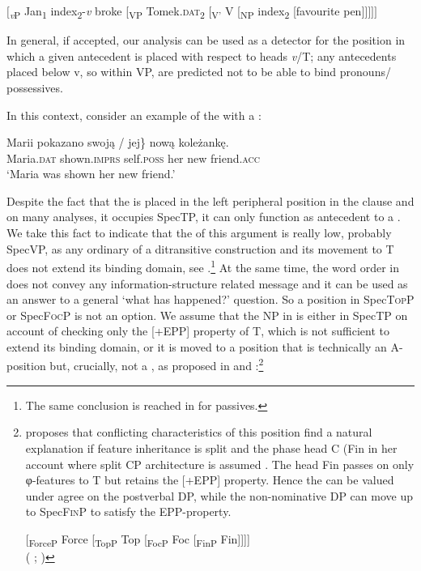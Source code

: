 \documentclass[output=paper,nonflat,colorlinks,citecolor=brown,newtxmath]{langsci/langscibook}
\begin{document}
\ea \label{ex:witkos:31}
$[$\textsubscript{\textit{v}P} Jan\textsubscript{1} index\textsubscript{2}-\textit{v} broke [\textsubscript{VP} Tomek.\textsc{dat}\textsubscript{2} [\textsubscript{V$’$} V [\textsubscript{NP} index\textsubscript{2} [favourite pen$]]]]]$\\
\z

\noindent In general, if accepted, our analysis can be used as a detector for the position in which a given antecedent is placed with respect to heads \textit{v}/T; any antecedents placed below v, so within VP, are predicted not to be able to bind  pronouns/ possessives.

In this context, consider an example of the   with a :


\ea \label{ex:witkos:32}
\gll Marii pokazano \minsp{\{*} swoją / jej\} nową koleżankę.\\
     Maria.\textsc{dat} shown.\textsc{imprs} {} self.\textsc{poss} {} her new friend.\textsc{acc}\\
\glt `Maria was shown her new friend.'
\z

\noindent Despite the fact that the  is placed in the left peripheral position in the clause and on many analyses, it occupies SpecTP, it can only function as antecedent to a  . We take this fact to indicate that the  of this argument is really low, probably SpecVP, as any ordinary  of a ditransitive construction and its movement to T does not extend its binding domain, see .\footnote{\label{fn21}The same conclusion is reached in \cite{mooreperlmutter2000} for   passives.} At the same time, the word order in  does not convey any information-structure related message and it can be used as an answer to a general ‘what has happened?’ question. So a position in Spec\textsc{Top}P or Spec\textsc{Foc}P is not an option. We assume that the  NP in  is either in SpecTP on account of checking only the [+EPP] property of T, which is not sufficient to extend its binding domain, or it is moved to a position that is technically an A-position but, crucially, not a , as proposed in \cite{germain2015} and \cite{citkoetal2018}:\footnote{\label{fn22}\cite{germain2015} proposes that conflicting characteristics of this position find a natural explanation if feature inheritance is split and the phase head C (Fin in her account where  split CP architecture is assumed . The head Fin passes on only φ-features to T but retains the [+EPP] property. Hence the  can be valued under agree on the postverbal DP, while the non-nominative DP can move up to Spec\textsc{Fin}P to satisfy the EPP-property.

\ea\label{split_cp_rus}
{[\textsubscript{ForceP} Force [\textsubscript{TopP} Top [\textsubscript{FocP} Foc [\textsubscript{FinP} Fin]]]]}\\
\xspace\hfill ( ; \citealt[428]{germain2015})
\z
}
\end{document}
